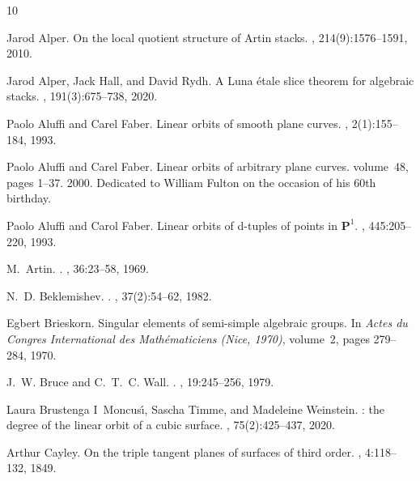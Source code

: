 \documentclass[reqno]{amsart}
\numberwithin{equation}{section}
\begin{document}
\begin{thebibliography}{10}

Jarod Alper.
\newblock On the local quotient structure of {A}rtin stacks.
, 214(9):1576--1591, 2010.

Jarod Alper, Jack Hall, and David Rydh.
\newblock A {L}una \'{e}tale slice theorem for algebraic stacks.
, 191(3):675--738, 2020.

Paolo Aluffi and Carel Faber.
\newblock Linear orbits of smooth plane curves.
, 2(1):155--184, 1993.

Paolo Aluffi and Carel Faber.
\newblock Linear orbits of arbitrary plane curves.
\newblock volume~48, pages 1--37. 2000.
\newblock Dedicated to William Fulton on the occasion of his 60th birthday.

Paolo Aluffi and Carol Faber.
\newblock Linear orbits of d-tuples of points in $\mathbf{P}^1$.
, 445:205--220, 1993.

M.~{Artin}.
.
, 36:23--58, 1969.

N.~D. {Beklemishev}.
.
, 37(2):54--62, 1982.

Egbert Brieskorn.
\newblock Singular elements of semi-simple algebraic groups.
\newblock In {\em Actes du Congres International des Math{\'e}maticiens (Nice, 1970)}, volume~2, pages 279--284, 1970.

J.~W. {Bruce} and C.~T.~C. {Wall}.
.
, 19:245--256, 1979.

Laura Brustenga I~Moncus\'{\i}, Sascha Timme, and Madeleine Weinstein.
: the degree of the linear orbit of a cubic surface.
, 75(2):425--437, 2020.

Arthur Cayley.
\newblock On the triple tangent planes of surfaces of third order.
, 4:118--132, 1849.


\end{thebibliography}
\end{document}
